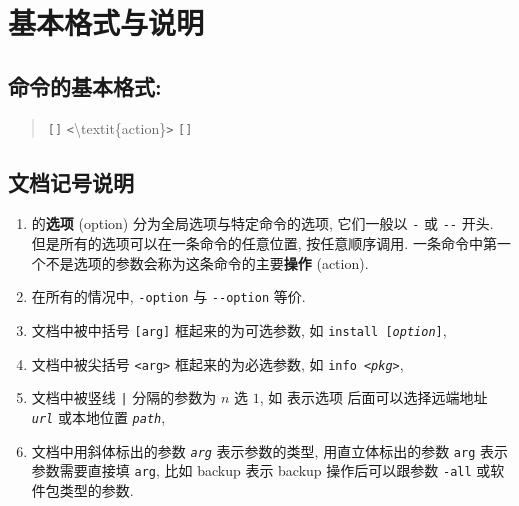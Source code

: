 
\section{基本格式与说明}

\subsection{{\mdseries\tlmgr} 命令的基本格式:}



\begin{quote}
    \tlmgr{} \texttt{[}\texttt{]} \texttt{<}\ac{\textit{action}}\texttt{>} \texttt{[}\texttt{]} 
\end{quote}

\subsection{文档记号说明}

\begin{enumerate}[(1)]
    \item \tlmgr 的\textbf{选项} (option) 分为全局选项与特定命令的选项, 它们一般以 \texttt{-} 或 \texttt{-{}-} 开头. 但是所有的选项可以在一条命令的任意位置, 按任意顺序调用. 一条命令中第一个不是选项的参数会称为这条命令的主要\textbf{操作} (action). 
    \item 在所有的情况中, \texttt{-option} 与 \texttt{-{}-option} 等价. 
    \item 文档中被中括号 \texttt{[arg]} 框起来的为可选参数, 如 \texttt{install [\textit{option}]},
    \item 文档中被尖括号 \texttt{<arg>} 框起来的为必选参数, 如 \texttt{info <\textit{pkg}>},
    \item 文档中被竖线 \texttt{|} 分隔的参数为 $ n $ 选 $ 1 $, 如   表示选项  后面可以选择远端地址 \texttt{\textit{url}} 或本地位置 \texttt{\textit{path}},
    \item 文档中用斜体标出的参数 \texttt{\textit{arg}} 表示参数的类型, 用直立体标出的参数 \texttt{arg} 表示参数需要直接填 \texttt{arg}, 比如 \ac{backup}  表示 \ac{backup} 操作后可以跟参数 \texttt{-all} 或软件包类型的参数. 
\end{enumerate}
